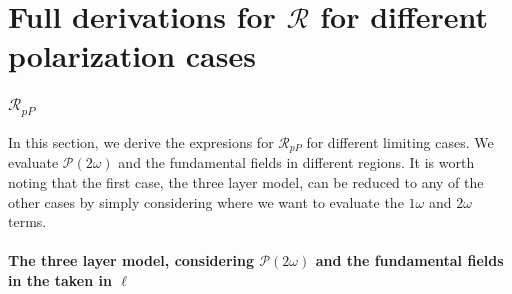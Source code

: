 \chapter{Full derivations for \texorpdfstring{$\mathcal{R}$}{R} for different
polarization cases}

\subsection{\texorpdfstring{$\mathcal{R}_{pP}$}{RpP}}

In this section, we derive the expresions for $\mathcal{R}_{pP}$ for different
limiting cases. We evaluate $\mathcal{P}(2\omega)$ and the fundamental fields in
different regions. It is worth noting that the first case, the three layer
model, can be reduced to any of the other cases by simply considering where we
want to evaluate the $1\omega$ and $2\omega$ terms.


\subsubsection{The three layer model, considering
\texorpdfstring{$\mathcal{P}(2\omega)$}{P(2w)} and the fundamental fields in the
taken in \texorpdfstring{$\ell$}{l}}

